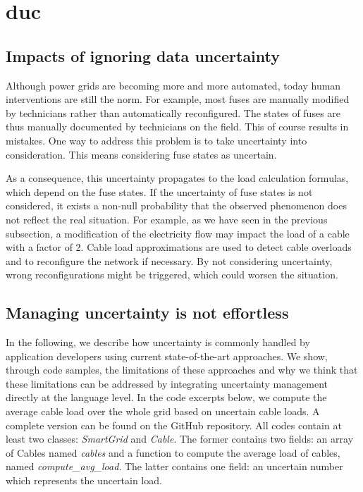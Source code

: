 \section[Data uncertainty]{\Gls{duc}}
\label{sec:example:duc}

\subsection{Impacts of ignoring data uncertainty} 
\label{subsec:example-possible-consequences}
Although power grids are becoming more and more automated, today human interventions are still the norm.
For example, most fuses are manually modified by technicians rather than automatically reconfigured.
The states of fuses are thus manually documented by technicians on the field. 
This of course results in mistakes. 
One way to address this problem is to take uncertainty into consideration.
This means considering fuse states as uncertain.

As a consequence, this uncertainty propagates to the load calculation formulas, which depend on the fuse states.
If the uncertainty of fuse states is not considered, it exists a non-null probability that the observed phenomenon does not reflect the real situation.
For example, as we have seen in the previous subsection, a modification of the electricity flow may impact the load of a cable with a factor of 2.
Cable load approximations are used to detect cable overloads and to reconfigure the network if necessary.
By not considering uncertainty, wrong reconfigurations might be triggered, which could worsen the situation.

\subsection{Managing uncertainty is not effortless}
In the following, we describe how uncertainty is commonly handled by application developers using current state-of-the-art approaches. 
We show, through code samples, the limitations of these approaches and why we think that these limitations can be addressed by integrating uncertainty management directly at the language level.
In the code excerpts below, we compute the average cable load over the whole grid based on uncertain cable loads. 
A complete version can be found on the GitHub repository. 
All codes contain at least two classes: \textit{SmartGrid} and \textit{Cable}.
The former contains two fields: an array of Cables named \textit{cables} and a function to compute the average load of cables, named \textit{compute\_avg\_load}.
The latter contains one field: an uncertain number which represents the uncertain load.

